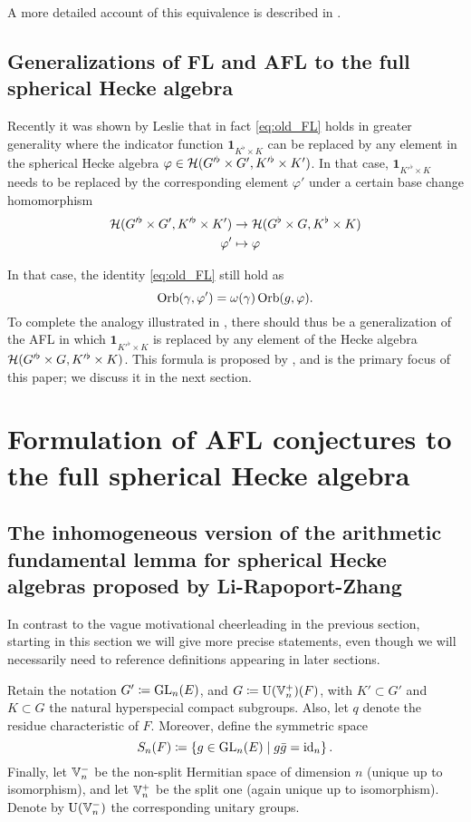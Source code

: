 A more detailed account of this equivalence is described in \cite[\S1.4]{ref:liuFJ}.

\subsection{Generalizations of FL and AFL to the full spherical Hecke algebra}
Recently it was shown by Leslie \cite{ref:leslie} that in fact
\eqref{eq:old_FL} holds in greater generality where the indicator function
$\mathbf{1}_{K^\flat \times K}$ can be replaced by any element in the spherical
Hecke algebra $\varphi \in \mathcal H(G'^\flat \times G', K'^\flat \times K')$.
In that case, $\mathbf{1}_{K'^\flat \times K}$ needs to be replaced
by the corresponding element $\varphi'$ under a certain base change homomorphism
\begin{align*}
  \mathcal H(G'^\flat \times G', K'^\flat \times K') &\to \mathcal H(G^\flat \times G, K^\flat \times K) \\
  \varphi' &\mapsto \varphi
\end{align*}

In that case, the identity \eqref{eq:old_FL} still hold as
\begin{equation}
  \operatorname{Orb}(\gamma, \varphi') = \omega(\gamma) \operatorname{Orb}(g, \varphi).
  \label{eq:eq:leslie_FL}
\end{equation}
To complete the analogy illustrated in ,
there should thus be a generalization of the AFL in which
$\mathbf{1}_{K'^\flat \times K}$ is replaced by any element of the Hecke algebra
$\mathcal H(G'^\flat \times G, K'^\flat \times K)$.
This formula is proposed by \cite{ref:AFLspherical},
and is the primary focus of this paper; we discuss it in the next section.

\section{Formulation of AFL conjectures to the full spherical Hecke algebra}
\subsection{The inhomogeneous version of the arithmetic fundamental lemma for spherical Hecke algebras proposed by Li-Rapoport-Zhang}
In contrast to the vague motivational cheerleading in the previous section,
starting in this section we will give more precise statements,
even though we will necessarily need to reference definitions appearing in later sections.

Retain the notation $G' \coloneqq \operatorname{GL}_n(E)$, and $G \coloneqq \operatorname{U}(\mathbb V_n^+)(F)$,
with $K' \subset G'$ and $K \subset G$ the natural hyperspecial compact subgroups.
Also, let $q$ denote the residue characteristic of $F$.
Moreover, define the symmetric space
\[ S_n(F) \coloneqq \left\{ g \in \operatorname{GL}_n(E) \mid g \bar{g} = \operatorname{id}_n \right\}. \]
Finally, let $\mathbb V_n^-$ be the non-split Hermitian space of dimension $n$
(unique up to isomorphism),
and let $\mathbb V_n^+$ be the split one (again unique up to isomorphism).
Denote by $\operatorname{U}(\mathbb V_n^-)$ the corresponding unitary groups.

